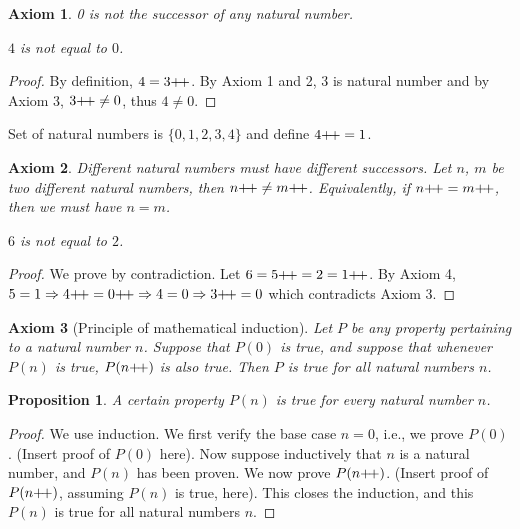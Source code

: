\documentclass[12pt]{article}
\newtheorem{axiom}{Axiom}
\newtheorem{proposition}{Proposition}[section]
\theoremstyle{remark}
\begin{document}
\begin{axiom}
    0 is not the successor of any natural number.
\end{axiom}

\begin{example}
	\textit{$4$ is not equal to $0$.}		  
\end{example}

\begin{proof}
    By definition, $4 = 3\inc$. By Axiom 1 and 2, 3 is natural number and by Axiom 3, $3\inc \neq 0$, thus $4 \neq 0$.
\end{proof}

\begin{cexample}
	Set of natural numbers is $\{0, 1, 2, 3, 4\}$ and define $4\inc = 1$.
\end{cexample}

\begin{axiom}
	Different natural numbers must have different successors. Let $n$, $m$ be two different natural numbers, then $n\inc \neq m\inc$. Equivalently, if $n\inc = m\inc$, then we must have $n=m$.
\end{axiom}

\begin{example}
	\textit{$6$ is not equal to $2$.}
\end{example}

\begin{proof}
    We prove by contradiction. Let $6 = 5\inc = 2 = 1\inc $. By Axiom 4, $5 = 1 \Rightarrow 4\inc = 0\inc \Rightarrow 4 = 0 \Rightarrow 3\inc = 0$ which contradicts Axiom 3.
\end{proof}

\begin{axiom}[Principle of mathematical induction]
	Let $P$ be any property pertaining to a natural number $n$. Suppose that $P(0)$ is true, and suppose that whenever $P(n)$ is true, $P(n\inc)$ is also true. Then $P$ is true for all natural numbers $n$. 
\end{axiom}

\begin{proposition}
    A certain property $ P(n) $ is true for every natural number $ n $.
\end{proposition}

\begin{proof}
	We use induction. We first verify the base case $ n = 0 $, i.e., we prove $ P(0) $. (Insert proof of $ P(0) $ here). Now suppose inductively that $ n $ is a natural number, and $ P(n) $ has been proven. We now prove $ P(n\inc) $. (Insert proof of $ P(n\inc) $, assuming $ P(n) $ is true, here). This closes the induction, and this $ P(n) $ is true for all natural numbers $ n $.
\end{proof}
\end{document}
